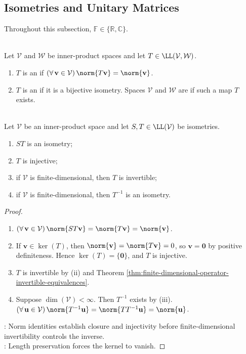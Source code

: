 \subsection{Isometries and Unitary Matrices}

Throughout this subsection, $\mathbb{F}\in\{\mathbb{R},\mathbb{C}\}$.

\begin{definition} \label{def:isometry-linear-map} \\
Let $\mathcal{V}$ and $\mathcal{W}$ be inner-product spaces and let $T\in\LL(\mathcal{V},\mathcal{W})$.
\begin{enumerate}[label=(\roman*)]
\setlength{\itemsep}{0pt}
\item $T$ is an  if $(\forall\,\mathbf{v}\in\mathcal{V})\,\norm{T\mathbf{v}}=\norm{\mathbf{v}}$.
\item $T$ is an  if it is a bijective isometry. Spaces $\mathcal{V}$ and $\mathcal{W}$ are  if such a map $T$ exists.
\end{enumerate}
\end{definition}

\begin{proposition} \label{prop:basic-isometry-properties} \\
Let $\mathcal{V}$ be an inner-product space and let $S,T\in\LL(\mathcal{V})$ be isometries.
\begin{enumerate}[label=(\roman*)]
\setlength{\itemsep}{0pt}
\item $ST$ is an isometry;
\item $T$ is injective;
\item if $\mathcal{V}$ is finite-dimensional, then $T$ is invertible;
\item if $\mathcal{V}$ is finite-dimensional, then $T^{-1}$ is an isometry.
\end{enumerate}
\begin{proof}
\begin{enumerate}[label=(\roman*)]
\setlength{\itemsep}{0pt}
\item $(\forall\,\mathbf{v}\in\mathcal{V})\,\norm{ST\mathbf{v}}=\norm{T\mathbf{v}}=\norm{\mathbf{v}}$.
\item If $\mathbf{v}\in\ker(T)$, then $\norm{\mathbf{v}}=\norm{T\mathbf{v}}=0$, so $\mathbf{v}=\mathbf{0}$ by positive definiteness. Hence $\ker(T)=\{\mathbf{0}\}$, and $T$ is injective.
\item $T$ is invertible by (ii) and Theorem \ref{thm:finite-dimensional-operator-invertible-equivalences}.
\item Suppose $\dim(\mathcal{V})<\infty$. Then $T^{-1}$ exists by (iii). $(\forall\,\mathbf{u}\in\mathcal{V})\,\norm{T^{-1}\mathbf{u}}=\norm{TT^{-1}\mathbf{u}}=\norm{\mathbf{u}}$.
\end{enumerate}
: Norm identities establish closure and injectivity before finite-dimensional invertibility controls the inverse.\\
: Length preservation forces the kernel to vanish.
\end{proof}
\end{proposition}

